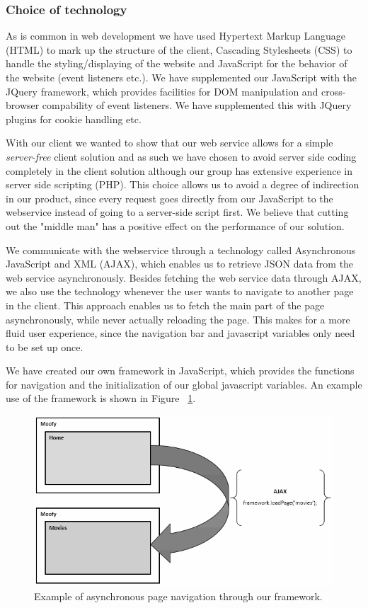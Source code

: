 \subsubsection{Choice of technology}

As is common in web development we have used Hypertext Markup Language (HTML) to mark up the structure of the client, Cascading Stylesheets (CSS) to handle the styling/displaying of the website and JavaScript for the behavior of the website (event listeners etc.). We have supplemented our JavaScript with the JQuery framework, which provides facilities for DOM manipulation and cross-browser compability of event listeners. We have supplemented this with JQuery plugins for cookie handling etc.

With our client we wanted to show that our web service allows for a simple \emph{server-free} client solution and as such we have chosen to avoid server side coding completely in the client solution although our group has extensive experience in server side scripting (PHP).
This choice allows us to avoid a degree of indirection in our product, since every request goes directly from our JavaScript to the webservice instead of going to a server-side script first. We believe that cutting out the "middle man" has a positive effect on the performance of our solution.

We communicate with the webservice through a technology called Asynchronous JavaScript and XML (AJAX), which enables us to retrieve JSON data from the web service asynchronously.
Besides fetching the web service data through AJAX, we also use the technology whenever the user wants to navigate to another page in the client. This approach enables us to fetch the main part of the page asynchronously, while never actually reloading the page. This makes for a more fluid user experience, since the navigation bar and javascript variables only need to be set up once.

We have created our own framework in JavaScript, which provides the functions for navigation and the initialization of our global javascript variables. An example use of the framework is shown in Figure ~\ref{fig:ajax}.

\begin{figure}[hbt]
	\centering
	\centerline{\includegraphics[scale=1]{./p1design/ajax.png}}
	\caption{Example of asynchronous page navigation through our framework.}
	\label{fig:ajax}
\end{figure}

